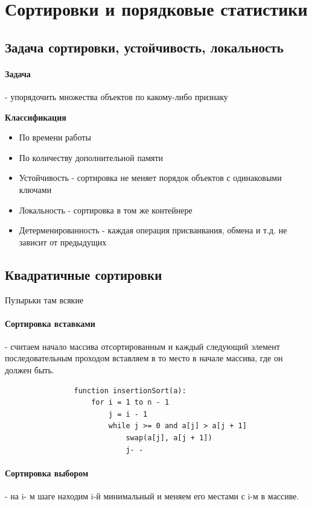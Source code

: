 \documentclass[a4paper,10pt]{article}
\begin{document}
	\section{Сортировки и порядковые статистики}
	\subsection{Задача сортировки, устойчивость, локальность}
	\paragraph{Задача} - упорядочить множества объектов по какому-либо признаку \\
	\begin{center} 
		\textbf{Классификация} 
	\end{center}
	\begin{itemize}
		\item По времени работы
		\item По количеству дополнительной памяти
		\item Устойчивость - сортировка не меняет порядок объектов с одинаковыми ключами
		\item Локальность - сортировка в том же контейнере
		\item Детерменированность - каждая операция присваивания, обмена и т.д. не зависит от предыдущих
	\end{itemize}
	\subsection{Квадратичные сортировки}
	Пузырьки там всякие \\
	\paragraph{Сортировка вставками} - считаем начало массива отсортированным и каждый следующий элемент последовательным проходом вставляем в то место в начале массива, где он должен быть.
		\begin{center}
			\begin{lstlisting}
				function insertionSort(a):
	  			    for i = 1 to n - 1
	    				j = i - 1
	    				while j >= 0 and a[j] > a[j + 1] 
	      					swap(a[j], a[j + 1])
	      					j- -
			\end{lstlisting}
		\end{center}
	\paragraph{Сортировка выбором} - на i- м шаге находим i-й минимальный и меняем его местами с i-м в массиве.\\
\end{document}
